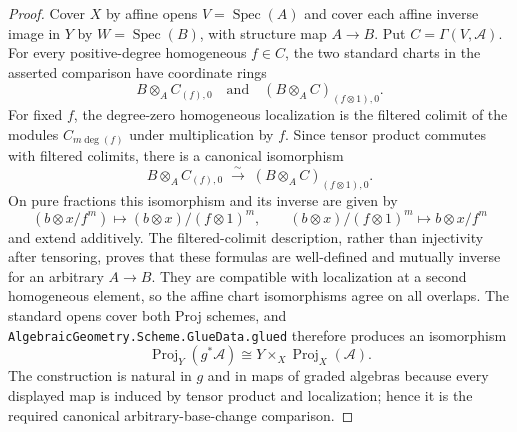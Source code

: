 \begin{proof}
  Cover $X$ by affine opens $V=\operatorname{Spec}(A)$ and cover each affine
  inverse image in $Y$ by $W=\operatorname{Spec}(B)$, with structure map
  $A\to B$.  Put $C=\Gamma(V,\mathcal A)$.  For every positive-degree
  homogeneous $f\in C$, the two standard charts in the asserted comparison
  have coordinate rings
  \[
    B\otimes_A C_{(f),0}\quad\text{and}\quad
    (B\otimes_A C)_{(f\otimes1),0}.
  \]
  For fixed $f$, the degree-zero homogeneous localization is the filtered
  colimit of the modules $C_{m\deg(f)}$ under multiplication by $f$.
  Since tensor product commutes with filtered colimits, there is a canonical
  isomorphism
  \[
    B\otimes_A C_{(f),0}\;\xrightarrow{\sim}\;
    (B\otimes_A C)_{(f\otimes1),0}.
  \]
  On pure fractions this isomorphism and its inverse are given by
  \[
    (b\otimes x/f^m)\longmapsto (b\otimes x)/(f\otimes1)^m,
    \qquad
    (b\otimes x)/(f\otimes1)^m\longmapsto b\otimes x/f^m
  \]
  and extend additively.  The filtered-colimit description, rather than
  injectivity after tensoring, proves that these formulas are well-defined and
  mutually inverse for an arbitrary $A\to B$.  They are compatible with
  localization at a second homogeneous element, so the affine chart
  isomorphisms agree on all overlaps.  The standard opens cover both Proj
  schemes, and \texttt{AlgebraicGeometry.Scheme.GlueData.glued} therefore
  produces an
  isomorphism
  \[
    \operatorname{Proj}_Y(g^*\mathcal A)\cong
    Y\times_X\operatorname{Proj}_X(\mathcal A).
  \]
  The construction is natural in $g$ and in maps of graded algebras because
  every displayed map is induced by tensor product and localization; hence it
  is the required canonical arbitrary-base-change comparison.
\end{proof}

